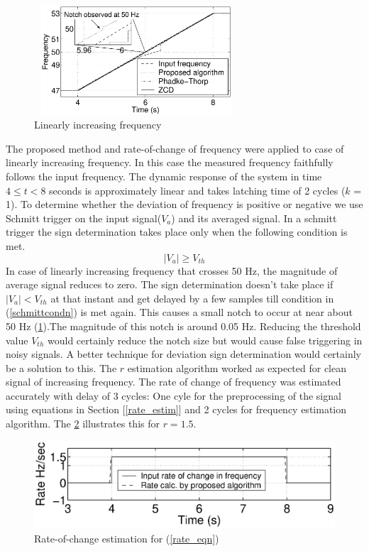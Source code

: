 \begin{figure}[!t]
\centering
\includegraphics[height=1.6in,width=3in]{kfreq.eps}
\caption{Linearly increasing frequency}
\label{fig2}
\end{figure}

The proposed method and rate-of-change of frequency were applied to case of linearly increasing frequency. In this case the measured frequency faithfully follows the input frequency. The dynamic response of the system in time $4 \leq t < 8$ seconds is approximately linear and takes latching time of 2 cycles ($k$ = 1). To determine whether the deviation of frequency is positive or negative we use Schmitt trigger on the input signal($V_{a}$) and its averaged signal. In a schmitt trigger the sign determination takes place only when the following condition is met. \begin{equation}|V_{a}| \geq V_{th}\label{schmittcondn}\end{equation} In case of linearly increasing frequency that crosses 50 Hz, the magnitude of average signal reduces to zero. The sign determination doesn't take place if $|V_{a}| < V_{th}$ at that instant and get delayed by a few samples till condition in (\ref{schmittcondn}) is met again. This causes a small notch to occur at near about 50 Hz (\figurename \ref{fig2}).The magnitude of this notch is around 0.05 Hz. Reducing the threshold value $V_{th}$ would certainly reduce the notch size but would cause false triggering in noisy signals. A better technique for deviation sign determination would  certainly be a solution to this.
The $r$ estimation algorithm worked as expected for clean signal of increasing frequency. The rate of change of frequency was estimated accurately with delay of 3 cycles: One cyle for the preprocessing of the signal using equations in Section [\ref{rate_estim}] and 2 cycles for frequency estimation algorithm. The \figurename \ref{kestim} illustrates this for $r=1.5$.

\begin{figure}[!t]
\centering
\includegraphics[scale=0.45]{ratekinput}
\caption{Rate-of-change estimation for (\ref{rate_eqn})}
\label{kestim}
\end{figure}



